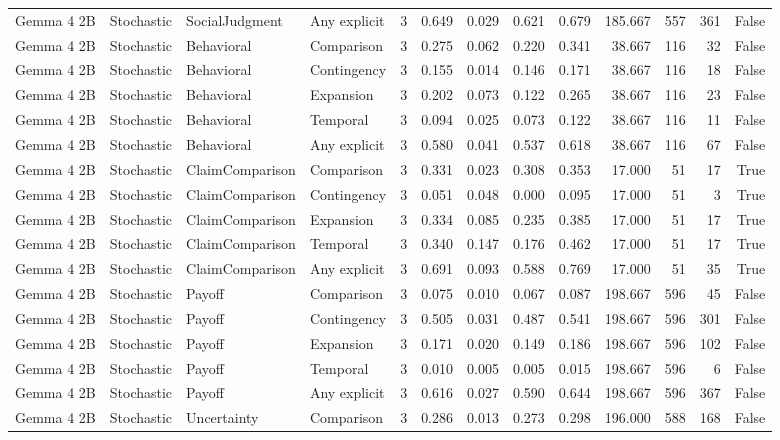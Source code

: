 \begin{tabular}{llllrrrrrrrrr}
Gemma 4 2B & Stochastic & SocialJudgment & Any explicit & 3 & 0.649 & 0.029 & 0.621 & 0.679 & 185.667 & 557 & 361 & False \\
Gemma 4 2B & Stochastic & Behavioral & Comparison & 3 & 0.275 & 0.062 & 0.220 & 0.341 & 38.667 & 116 & 32 & False \\
Gemma 4 2B & Stochastic & Behavioral & Contingency & 3 & 0.155 & 0.014 & 0.146 & 0.171 & 38.667 & 116 & 18 & False \\
Gemma 4 2B & Stochastic & Behavioral & Expansion & 3 & 0.202 & 0.073 & 0.122 & 0.265 & 38.667 & 116 & 23 & False \\
Gemma 4 2B & Stochastic & Behavioral & Temporal & 3 & 0.094 & 0.025 & 0.073 & 0.122 & 38.667 & 116 & 11 & False \\
Gemma 4 2B & Stochastic & Behavioral & Any explicit & 3 & 0.580 & 0.041 & 0.537 & 0.618 & 38.667 & 116 & 67 & False \\
Gemma 4 2B & Stochastic & ClaimComparison & Comparison & 3 & 0.331 & 0.023 & 0.308 & 0.353 & 17.000 & 51 & 17 & True \\
Gemma 4 2B & Stochastic & ClaimComparison & Contingency & 3 & 0.051 & 0.048 & 0.000 & 0.095 & 17.000 & 51 & 3 & True \\
Gemma 4 2B & Stochastic & ClaimComparison & Expansion & 3 & 0.334 & 0.085 & 0.235 & 0.385 & 17.000 & 51 & 17 & True \\
Gemma 4 2B & Stochastic & ClaimComparison & Temporal & 3 & 0.340 & 0.147 & 0.176 & 0.462 & 17.000 & 51 & 17 & True \\
Gemma 4 2B & Stochastic & ClaimComparison & Any explicit & 3 & 0.691 & 0.093 & 0.588 & 0.769 & 17.000 & 51 & 35 & True \\
Gemma 4 2B & Stochastic & Payoff & Comparison & 3 & 0.075 & 0.010 & 0.067 & 0.087 & 198.667 & 596 & 45 & False \\
Gemma 4 2B & Stochastic & Payoff & Contingency & 3 & 0.505 & 0.031 & 0.487 & 0.541 & 198.667 & 596 & 301 & False \\
Gemma 4 2B & Stochastic & Payoff & Expansion & 3 & 0.171 & 0.020 & 0.149 & 0.186 & 198.667 & 596 & 102 & False \\
Gemma 4 2B & Stochastic & Payoff & Temporal & 3 & 0.010 & 0.005 & 0.005 & 0.015 & 198.667 & 596 & 6 & False \\
Gemma 4 2B & Stochastic & Payoff & Any explicit & 3 & 0.616 & 0.027 & 0.590 & 0.644 & 198.667 & 596 & 367 & False \\
Gemma 4 2B & Stochastic & Uncertainty & Comparison & 3 & 0.286 & 0.013 & 0.273 & 0.298 & 196.000 & 588 & 168 & False \\

\end{tabular}
